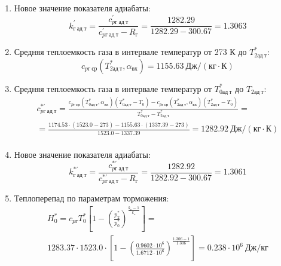 \documentclass[a4paper,12pt]{article}
\begin{document}
\begin{enumerate}
        \item Новое значение показателя адиабаты:
        \[
            k_{г\ ад\ т}^\prime = \frac{c_{pг\ ад\ т}^\prime}{c_{pг\ ад\ т}^\prime - R_г} =
                \frac{
                    1282.29
                }{
                    1282.29 - 300.67
                }
            = 1.3063
        \]

        \item Средняя теплоемкость газа в интервале температур от 273 К до $T_{2ад\ т}^*$:
        \[
            c_{pг\ ср} (T_{2ад\ т}^*, \alpha_{вх}) =
            1155.63 \ Дж/(кг \cdot К)
        \]

        \item Средняя теплоемкость газа в интервале температур от $T_{0ад\ т}^*$ до $T_{2ад\ т}$:
        \begin{gather*}
            c_{pг\ ад\ т}^{*\prime} = \frac{
		        c_{pг\ ср}(T_{0ад\ т}^*, \alpha_{вх}) (T_{0ад\ т}^* - T_0) - c_{pг\ ср}(T_{2ад\ т}^*, \alpha_{вх}) (T_{2ад\ т}^* - T_0)
		    }{
		        T_{0ад\ т}^* - T_{2ад\ т}^*} =\\
            =\frac{
		        1174.53 \cdot
                (1523.0 - 273) -
		        1155.63 \cdot
                (1337.39 - 273)
		    }{
		        1523.0 - 1337.39} =
		    1282.92 \ Дж / (кг \cdot К)\\
        \end{gather*}

        \item Новое значение показателя адиабаты:
        \[
            k_{г\ ад\ т}^{*\prime} = \frac{c_{pг\ ад\ т}^{*\prime}}{c_{pг\ ад\ т}^{*\prime} - R_г} =
                \frac{
                    1282.92
                }{
                    1282.92 - 300.67
                }
            = 1.3061
        \]

        \item Теплоперепад по параметрам торможения:
        \begin{gather*}
            H_0^* = c_{pг} T_0^* \left[
                        1 - \left(
                                \frac{p_2^*}{p_0^*}
                            \right) ^
                        \frac{k_г - 1}{k_г}
                    \right] =\\
            1283.37 \cdot 1523.0 \cdot
                    \left[
                        1 - \left(
                                \frac{
                                    0.9602 \cdot 10^6
                                }{
                                    1.6712 \cdot 10^6
                                }
                            \right) ^
                        \frac{1.306 - 1}{1.306}
                    \right]
            = 0.238 \cdot 10^6 \ Дж/кг\\
        \end{gather*}


\end{enumerate}
\end{document}
